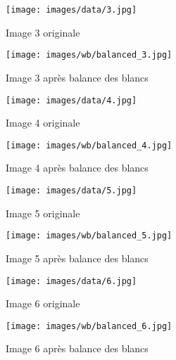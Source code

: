 \documentclass[12pt]{article}
\begin{document}
\begin{figure}[H]
    \centering
    \begin{minipage}{0.48\textwidth}
        \centering
        \texttt{[image: images/data/3.jpg]}
        \caption{Image 3 originale}
    \end{minipage}
    \hfill
    \begin{minipage}{0.48\textwidth}
        \centering
        \texttt{[image: images/wb/balanced\_3.jpg]}
        \caption{Image 3 après balance des blancs}
    \end{minipage}
\end{figure}

\begin{figure}[H]
    \centering
    \begin{minipage}{0.48\textwidth}
        \centering
        \texttt{[image: images/data/4.jpg]}
        \caption{Image 4 originale}
    \end{minipage}
    \hfill
    \begin{minipage}{0.48\textwidth}
        \centering
        \texttt{[image: images/wb/balanced\_4.jpg]}
        \caption{Image 4 après balance des blancs}
    \end{minipage}
\end{figure}

\begin{figure}[H]
    \centering
    \begin{minipage}{0.48\textwidth}
        \centering
        \texttt{[image: images/data/5.jpg]}
        \caption{Image 5 originale}
    \end{minipage}
    \hfill
    \begin{minipage}{0.48\textwidth}
        \centering
        \texttt{[image: images/wb/balanced\_5.jpg]}
        \caption{Image 5 après balance des blancs}
    \end{minipage}
\end{figure}

\begin{figure}[H]
    \centering
    \begin{minipage}{0.48\textwidth}
        \centering
        \texttt{[image: images/data/6.jpg]}
        \caption{Image 6 originale}
    \end{minipage}
    \hfill
    \begin{minipage}{0.48\textwidth}
        \centering
        \texttt{[image: images/wb/balanced\_6.jpg]}
        \caption{Image 6 après balance des blancs}
    \end{minipage}
\end{figure}
\end{document}

